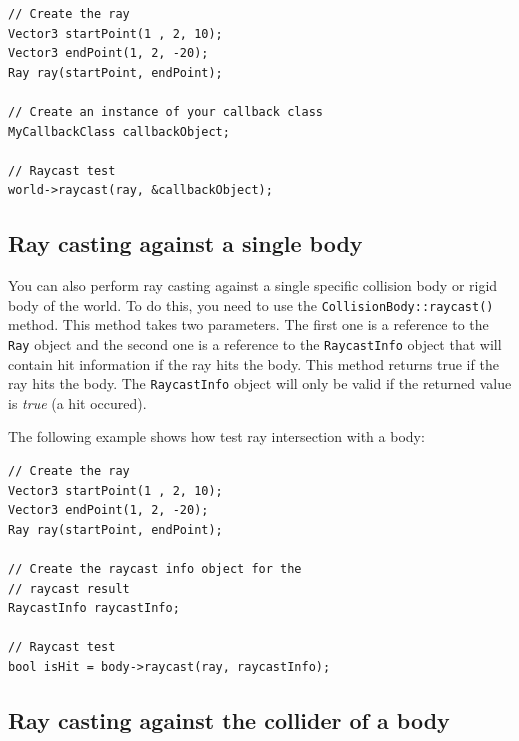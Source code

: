 \documentclass[a4paper,12pt]{article}
\begin{document}
    \begin{lstlisting}
// Create the ray
Vector3 startPoint(1 , 2, 10);
Vector3 endPoint(1, 2, -20);
Ray ray(startPoint, endPoint);

// Create an instance of your callback class
MyCallbackClass callbackObject;

// Raycast test
world->raycast(ray, &callbackObject);
    \end{lstlisting}

    \vspace{0.6cm}

    \subsection{Ray casting against a single body}

    \begin{sloppypar}

    You can also perform ray casting against a single specific collision body or rigid body of the world. To do this, you need to use the
    \texttt{CollisionBody::raycast()} method. This method takes two parameters. The first one is a reference to the \texttt{Ray} object and the second one
    is a reference to the \texttt{RaycastInfo} object that will contain hit information if the ray hits the body. This method returns true if the ray hits the
    body. The \texttt{RaycastInfo} object will only be valid if the returned value is \emph{true} (a hit occured). \\

    \end{sloppypar}

    The following example shows how test ray intersection with a body: \\

    \begin{lstlisting}
// Create the ray
Vector3 startPoint(1 , 2, 10);
Vector3 endPoint(1, 2, -20);
Ray ray(startPoint, endPoint);

// Create the raycast info object for the
// raycast result
RaycastInfo raycastInfo;

// Raycast test
bool isHit = body->raycast(ray, raycastInfo);
    \end{lstlisting}

    \vspace{0.6cm}

    \subsection{Ray casting against the collider of a body}
\end{document}
